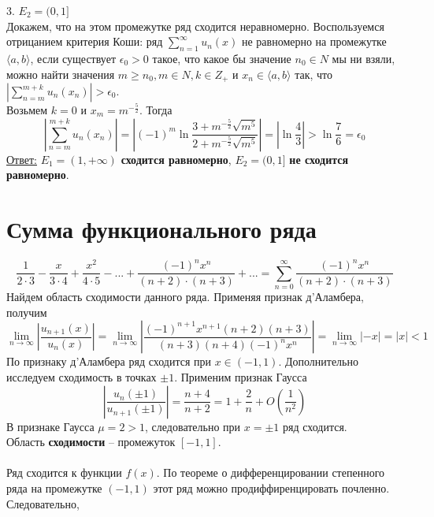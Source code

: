 \documentclass[a5paper, 10pt]{article}
\theoremstyle{definition}
\theoremstyle{plain}
\theoremstyle{remark}
\begin{document}
3.  $ E_2 = (0 , 1]$\\
Докажем, что на этом промежутке ряд сходится неравномерно. Воспользуемся отрицанием критерия Коши: ряд $\sum  \limits_{n = 1}^{\infty} u_n (x)$ не равномерно на промежутке $\langle a, b \rangle$, если существует $\epsilon_0 > 0$ такое, что какое бы значение $n_0 \in N$ мы ни взяли, можно найти значения $m \geq n_0, m \in N, k \in Z_+$ и $x_n \in \langle a, b \rangle$ так, что $\left|  \sum  \limits_{n = m}^{m+k} u_n (x_n) \right| > \epsilon_0$. \\
Возьмем $k = 0$ и $x_m = m^{-\frac{5}{2}}$. Тогда
\begin{equation*}
\left|  \sum  \limits_{n = m}^{m+k} u_n (x_n) \right|  = \left|(-1)^m \ln \frac{3+ m^{-\frac{5}{2}}\sqrt{m^5}}{2+ m^{-\frac{5}{2}}\sqrt{m^5}}\right|  =  \left|\ln \frac{4}{3}\right| > \ln \frac{7}{6} = \epsilon_0
\end{equation*}
\underline{Ответ:}   $ E_1 = (1 , + \infty)$ \textbf{сходится равномерно},  $ E_2 = (0 , 1]$ \textbf{ не сходится равномерно}.


\newpage
\section{Сумма функционального ряда}
\begin{equation*}
\frac{1}{2 \cdot 3} - \frac{x}{3 \cdot 4} + \frac{x^2}{4 \cdot 5} - ... + \frac{(-1)^n x^n}{(n+ 2) \cdot(n+ 3)} + ... = 
\sum  \limits_{n = 0}^{\infty} \frac{(-1)^n x^n}{(n+ 2) \cdot(n+ 3)}
\end{equation*}
Найдем область сходимости данного ряда. Применяя признак  д'Аламбера, получим
\begin{equation*}
\lim_{n \to \infty} \left| \frac{u_{n+1} (x)}{u_{n} (x)} \right| =
 \lim_{n \to \infty}  \left| \frac{(-1)^{n+1} x^{n+1}(n+ 2) (n+ 3)}{(n+ 3) (n+ 4) (-1)^n x^n} \right| = 
 \lim_{n \to \infty}  \left| - x \right| = \left|  x \right|  < 1
\end{equation*}
По признаку д'Аламбера ряд сходится при $ x \in (-1, 1)$. Дополнительно исследуем сходимость в точках $\pm 1$. Применим признак Гаусса
\begin{equation*}
 \left| \frac{u_{n} (\pm 1)}{u_{n+1} (\pm 1)} \right| = \frac{n+ 4}{n+ 2} = 1 + \frac{2}{n} + O\left(\frac{1}{n^2} \right)
\end{equation*}
В признаке Гаусса $\mu = 2 > 1$, следовательно при $x = \pm 1$ ряд сходится.\\
Область \textbf{сходимости} -- промежуток $[-1, 1]$.\\\\
Ряд сходится к функции $f(x)$. По теореме о дифференцировании степенного ряда на промежутке $ (-1, 1)$ этот ряд можно продиффиренцировать почленно. Следовательно,
\end{document}
